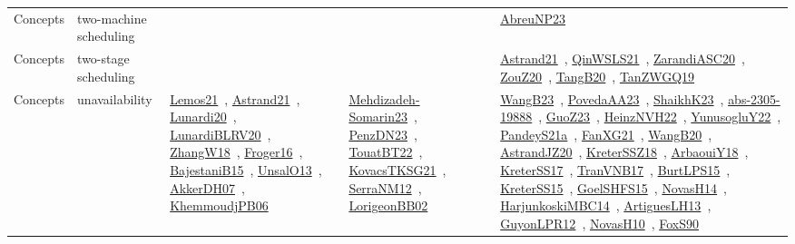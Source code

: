 {\begin{longtable}{lp{3cm}>{\raggedright\arraybackslash}p{6cm}>{\raggedright\arraybackslash}p{6cm}>{\raggedright\arraybackslash}p{8cm}}
Concepts & two-machine scheduling &  &  & \href{../works/AbreuNP23.pdf}{AbreuNP23}~\cite{AbreuNP23}\\
Concepts & two-stage scheduling &  &  & \href{../works/Astrand21.pdf}{Astrand21}~\cite{Astrand21}, \href{../works/QinWSLS21.pdf}{QinWSLS21}~\cite{QinWSLS21}, \href{../works/ZarandiASC20.pdf}{ZarandiASC20}~\cite{ZarandiASC20}, \href{../works/ZouZ20.pdf}{ZouZ20}~\cite{ZouZ20}, \href{../works/TangB20.pdf}{TangB20}~\cite{TangB20}, \href{../works/TanZWGQ19.pdf}{TanZWGQ19}~\cite{TanZWGQ19}\\
Concepts & unavailability & \href{../works/Lemos21.pdf}{Lemos21}~\cite{Lemos21}, \href{../works/Astrand21.pdf}{Astrand21}~\cite{Astrand21}, \href{../works/Lunardi20.pdf}{Lunardi20}~\cite{Lunardi20}, \href{../works/LunardiBLRV20.pdf}{LunardiBLRV20}~\cite{LunardiBLRV20}, \href{../works/ZhangW18.pdf}{ZhangW18}~\cite{ZhangW18}, \href{../works/Froger16.pdf}{Froger16}~\cite{Froger16}, \href{../works/BajestaniB15.pdf}{BajestaniB15}~\cite{BajestaniB15}, \href{../works/UnsalO13.pdf}{UnsalO13}~\cite{UnsalO13}, \href{../works/AkkerDH07.pdf}{AkkerDH07}~\cite{AkkerDH07}, \href{../works/KhemmoudjPB06.pdf}{KhemmoudjPB06}~\cite{KhemmoudjPB06} & \href{../works/Mehdizadeh-Somarin23.pdf}{Mehdizadeh-Somarin23}~\cite{Mehdizadeh-Somarin23}, \href{../works/PenzDN23.pdf}{PenzDN23}~\cite{PenzDN23}, \href{../works/TouatBT22.pdf}{TouatBT22}~\cite{TouatBT22}, \href{../works/KovacsTKSG21.pdf}{KovacsTKSG21}~\cite{KovacsTKSG21}, \href{../works/SerraNM12.pdf}{SerraNM12}~\cite{SerraNM12}, \href{../works/LorigeonBB02.pdf}{LorigeonBB02}~\cite{LorigeonBB02} & \href{../works/WangB23.pdf}{WangB23}~\cite{WangB23}, \href{../works/PovedaAA23.pdf}{PovedaAA23}~\cite{PovedaAA23}, \href{../works/ShaikhK23.pdf}{ShaikhK23}~\cite{ShaikhK23}, \href{../works/abs-2305-19888.pdf}{abs-2305-19888}~\cite{abs-2305-19888}, \href{../works/GuoZ23.pdf}{GuoZ23}~\cite{GuoZ23}, \href{../works/HeinzNVH22.pdf}{HeinzNVH22}~\cite{HeinzNVH22}, \href{../works/YunusogluY22.pdf}{YunusogluY22}~\cite{YunusogluY22}, \href{../works/PandeyS21a.pdf}{PandeyS21a}~\cite{PandeyS21a}, \href{../works/FanXG21.pdf}{FanXG21}~\cite{FanXG21}, \href{../works/WangB20.pdf}{WangB20}~\cite{WangB20}, \href{../works/AstrandJZ20.pdf}{AstrandJZ20}~\cite{AstrandJZ20}, \href{../works/KreterSSZ18.pdf}{KreterSSZ18}~\cite{KreterSSZ18}, \href{../works/ArbaouiY18.pdf}{ArbaouiY18}~\cite{ArbaouiY18}, \href{../works/KreterSS17.pdf}{KreterSS17}~\cite{KreterSS17}, \href{../works/TranVNB17.pdf}{TranVNB17}~\cite{TranVNB17}, \href{../works/BurtLPS15.pdf}{BurtLPS15}~\cite{BurtLPS15}, \href{../works/KreterSS15.pdf}{KreterSS15}~\cite{KreterSS15}, \href{../works/GoelSHFS15.pdf}{GoelSHFS15}~\cite{GoelSHFS15}, \href{../works/NovasH14.pdf}{NovasH14}~\cite{NovasH14}, \href{../works/HarjunkoskiMBC14.pdf}{HarjunkoskiMBC14}~\cite{HarjunkoskiMBC14}, \href{../works/ArtiguesLH13.pdf}{ArtiguesLH13}~\cite{ArtiguesLH13}, \href{../works/GuyonLPR12.pdf}{GuyonLPR12}~\cite{GuyonLPR12}, \href{../works/NovasH10.pdf}{NovasH10}~\cite{NovasH10}, \href{../works/FoxS90.pdf}{FoxS90}~\cite{FoxS90}\\
\end{longtable}
}

